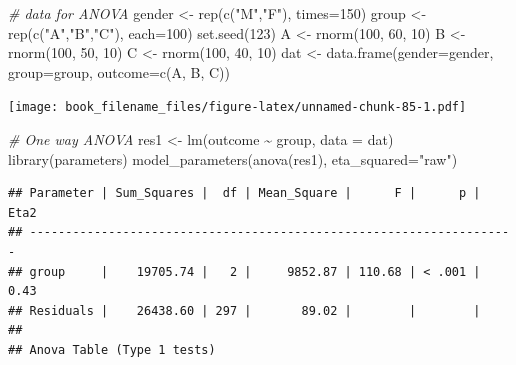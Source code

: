 \documentclass[
  ja=standard, xelatex, base=12pt]{bxjsreport}
\newenvironment{Shaded}{\begin{snugshade}}{\end{snugshade}}
\newcommand{\AttributeTok}[1]{\textcolor[rgb]{0.77,0.63,0.00}{#1}}
\newcommand{\CommentTok}[1]{\textcolor[rgb]{0.56,0.35,0.01}{\textit{#1}}}
\newcommand{\DecValTok}[1]{\textcolor[rgb]{0.00,0.00,0.81}{#1}}
\newcommand{\FunctionTok}[1]{\textcolor[rgb]{0.00,0.00,0.00}{#1}}
\newcommand{\NormalTok}[1]{#1}
\newcommand{\OtherTok}[1]{\textcolor[rgb]{0.56,0.35,0.01}{#1}}
\newcommand{\SpecialCharTok}[1]{\textcolor[rgb]{0.00,0.00,0.00}{#1}}
\newcommand{\StringTok}[1]{\textcolor[rgb]{0.31,0.60,0.02}{#1}}
\begin{document}
\begin{Shaded}
\begin{Highlighting}[]
\CommentTok{\# data for ANOVA}
\NormalTok{gender }\OtherTok{\textless{}{-}} \FunctionTok{rep}\NormalTok{(}\FunctionTok{c}\NormalTok{(}\StringTok{"M"}\NormalTok{,}\StringTok{"F"}\NormalTok{), }\AttributeTok{times=}\DecValTok{150}\NormalTok{)}
\NormalTok{group }\OtherTok{\textless{}{-}} \FunctionTok{rep}\NormalTok{(}\FunctionTok{c}\NormalTok{(}\StringTok{"A"}\NormalTok{,}\StringTok{"B"}\NormalTok{,}\StringTok{"C"}\NormalTok{), }\AttributeTok{each=}\DecValTok{100}\NormalTok{)}
\FunctionTok{set.seed}\NormalTok{(}\DecValTok{123}\NormalTok{)}
\NormalTok{A }\OtherTok{\textless{}{-}} \FunctionTok{rnorm}\NormalTok{(}\DecValTok{100}\NormalTok{, }\DecValTok{60}\NormalTok{, }\DecValTok{10}\NormalTok{)}
\NormalTok{B }\OtherTok{\textless{}{-}} \FunctionTok{rnorm}\NormalTok{(}\DecValTok{100}\NormalTok{, }\DecValTok{50}\NormalTok{, }\DecValTok{10}\NormalTok{)}
\NormalTok{C }\OtherTok{\textless{}{-}} \FunctionTok{rnorm}\NormalTok{(}\DecValTok{100}\NormalTok{, }\DecValTok{40}\NormalTok{, }\DecValTok{10}\NormalTok{)}
\NormalTok{dat }\OtherTok{\textless{}{-}} \FunctionTok{data.frame}\NormalTok{(}\AttributeTok{gender=}\NormalTok{gender, }\AttributeTok{group=}\NormalTok{group, }\AttributeTok{outcome=}\FunctionTok{c}\NormalTok{(A, B, C))}
\end{Highlighting}
\end{Shaded}

\texttt{[image: book\_filename\_files/figure-latex/unnamed-chunk-85-1.pdf]}

\begin{Shaded}
\begin{Highlighting}[]
\CommentTok{\# One way ANOVA}
\NormalTok{res1 }\OtherTok{\textless{}{-}} \FunctionTok{lm}\NormalTok{(outcome }\SpecialCharTok{\textasciitilde{}}\NormalTok{ group, }\AttributeTok{data =}\NormalTok{ dat)}
\FunctionTok{library}\NormalTok{(parameters)}
\FunctionTok{model\_parameters}\NormalTok{(}\FunctionTok{anova}\NormalTok{(res1), }\AttributeTok{eta\_squared=}\StringTok{"raw"}\NormalTok{)}
\end{Highlighting}
\end{Shaded}

\begin{verbatim}
## Parameter | Sum_Squares |  df | Mean_Square |      F |      p | Eta2
## --------------------------------------------------------------------
## group     |    19705.74 |   2 |     9852.87 | 110.68 | < .001 | 0.43
## Residuals |    26438.60 | 297 |       89.02 |        |        |     
## 
## Anova Table (Type 1 tests)
\end{verbatim}
\end{document}
